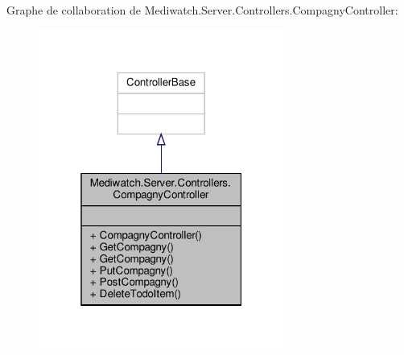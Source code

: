 Graphe de collaboration de Mediwatch.\+Server.\+Controllers.\+Compagny\+Controller\+:
\nopagebreak
\begin{figure}[H]
\begin{center}
\leavevmode
\includegraphics[width=229pt]{class_mediwatch_1_1_server_1_1_controllers_1_1_compagny_controller__coll__graph}
\end{center}
\end{figure}
